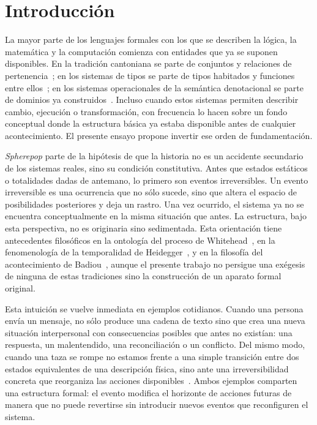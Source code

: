 \documentclass[12pt]{article}
\theoremstyle{plain}
\theoremstyle{definition}
\begin{document}
\newpage
\tableofcontents
\newpage

\section{Introducción}
\label{sec:intro}

La mayor parte de los lenguajes formales con los que se describen la lógica, la matemática y la computación comienza con entidades que ya se suponen disponibles. En la tradición cantoniana se parte de conjuntos y relaciones de pertenencia~\cite{cantor,zermelo}; en los sistemas de tipos se parte de tipos habitados y funciones entre ellos~\cite{martinlof,homotopy}; en los sistemas operacionales de la semántica denotacional se parte de dominios ya construidos~\cite{scottdana,abramsky}. Incluso cuando estos sistemas permiten describir cambio, ejecución o transformación, con frecuencia lo hacen sobre un fondo conceptual donde la estructura básica ya estaba disponible antes de cualquier acontecimiento. El presente ensayo propone invertir ese orden de fundamentación.

\emph{Spherepop} parte de la hipótesis de que la historia no es un accidente secundario de los sistemas reales, sino su condición constitutiva. Antes que estados estáticos o totalidades dadas de antemano, lo primero son eventos irreversibles. Un evento irreversible es una ocurrencia que no sólo sucede, sino que altera el espacio de posibilidades posteriores y deja un rastro. Una vez ocurrido, el sistema ya no se encuentra conceptualmente en la misma situación que antes. La estructura, bajo esta perspectiva, no es originaria sino sedimentada. Esta orientación tiene antecedentes filosóficos en la ontología del proceso de Whitehead~\cite{whitehead}, en la fenomenología de la temporalidad de Heidegger~\cite{heidegger}, y en la filosofía del acontecimiento de Badiou~\cite{badiou}, aunque el presente trabajo no persigue una exégesis de ninguna de estas tradiciones sino la construcción de un aparato formal original.

Esta intuición se vuelve inmediata en ejemplos cotidianos. Cuando una persona envía un mensaje, no sólo produce una cadena de texto sino que crea una nueva situación interpersonal con consecuencias posibles que antes no existían: una respuesta, un malentendido, una reconciliación o un conflicto. Del mismo modo, cuando una taza se rompe no estamos frente a una simple transición entre dos estados equivalentes de una descripción física, sino ante una irreversibilidad concreta que reorganiza las acciones disponibles~\cite{prigogine}. Ambos ejemplos comparten una estructura formal: el evento modifica el horizonte de acciones futuras de manera que no puede revertirse sin introducir nuevos eventos que reconfiguren el sistema.
\end{document}
